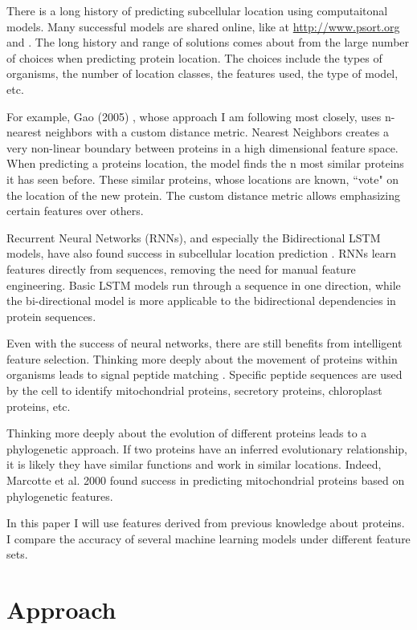 \documentclass{bioinfo}
\begin{document}
There is a long history of predicting subcellular location using computaitonal models.
Many successful models are shared online, like at \url{http://www.psort.org} and \citep{meinken_subcellular_2017}.
The long history and range of solutions comes about from the large number of choices when predicting protein location.
The choices include the types of organisms, the number of location classes, the features used, the type of model, etc.

For example, Gao (2005) \cite{gao_prediction_2005}, whose approach I am following most closely, uses n-nearest neighbors with a custom distance metric.
Nearest Neighbors creates a very non-linear boundary between proteins in a high dimensional feature space.
When predicting a proteins location, the model finds the n most similar proteins it has seen before.
These similar proteins, whose locations are known, ``vote" on the location of the new protein.
The custom distance metric allows emphasizing certain features over others.

Recurrent Neural Networks (RNNs), and especially the Bidirectional LSTM models, have also found success in subcellular location prediction \citep{thireou_bidirectional_2007}.
RNNs learn features directly from sequences, removing the need for manual feature engineering.
Basic LSTM models run through a sequence in one direction, while the bi-directional model is more applicable to the bidirectional dependencies in protein sequences.

Even with the success of neural networks, there are still benefits from intelligent feature selection.
Thinking more deeply about the movement of proteins within organisms leads to signal peptide matching \citep{nielsen_identification_1997}.
Specific peptide sequences are used by the cell to identify mitochondrial proteins, secretory proteins, chloroplast proteins, etc.

Thinking more deeply about the evolution of different proteins leads to a phylogenetic approach.
If two proteins have an inferred evolutionary relationship, it is likely they have similar functions and work in similar locations.
Indeed, Marcotte et al. 2000 \cite{marcotte_localizing_2000} found success in predicting mitochondrial proteins based on phylogenetic features.

In this paper I will use features derived from previous knowledge about proteins.
I compare the accuracy of several machine learning models under different feature sets.

\section{Approach}
\end{document}
